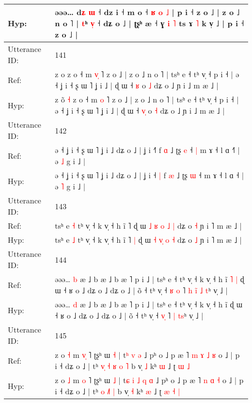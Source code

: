 \documentclass[10pt]{article}
\DeclareRobustCommand{\hl}[1]{{\textcolor{red}{#1}}}
\begin{document}
\begin{longtable}{ll}
 \\
Hyp: & əəə… d\hl{ʑ} \hl{ɯ} ˧ dz i ˧ m o ˧\hl{ }\hl{ʁ}\hl{ }\hl{o}\hl{ }\hl{˩} | p i ˧ z o ˩ | z o ˩ n o ˥ | \hl{}\hl{t}ʰ \hl{v}\hl{̩} ˧ dʑ o ˩ | ʈʂʰ æ ˧ ɣ \hl{i} \hl{˥} ts ɤ \hl{˥} k v̩ ˩ | p i ˧ z o ˩ |
 \\
\midrule
Utterance ID: & 141 \\
Ref: & z o\hl{}\hl{}\hl{} z o ˧ m \hl{v}\hl{̩} ˥ z o ˩ | z o ˩ n o ˥ | tsʰ e ˧ tʰ v̩ ˧ p i ˧ | ə ˧ ʝ i ˧ ʂ ɯ ˥ ʝ i ˩ | ɖ ɯ ˧ \hl{}\hl{ʁ} o \hl{˩} dʑ o ˩ ɲ i ˩ m æ ˩ |
 \\
Hyp: & z o\hl{̃}\hl{ }\hl{˧} z o ˧ m \hl{}\hl{o} ˥ z o ˩ | z o ˩ n o ˥ | tsʰ e ˧ tʰ v̩ ˧ p i ˧ | ə ˧ ʝ i ˧ ʂ ɯ ˥ ʝ i ˩ | ɖ ɯ ˧ \hl{v}\hl{̩} o \hl{˧} dʑ o ˩ ɲ i ˩ m æ ˩ |
 \\
\midrule
Utterance ID: & 142 \\
Ref: & ə ˧ ʝ i ˧ ʂ ɯ ˥ ʝ i ˩ dʑ o ˩ | ʝ i ˧\hl{}\hl{˥} f \hl{ɑ} ˩ ʈʂ \hl{e} ˧\hl{ }\hl{|} m ɤ ˧ l ɑ ˧\hl{˥} | ə \hl{˩} g i ˩ |
 \\
Hyp: & ə ˧ ʝ i ˧ ʂ ɯ ˥ ʝ i ˩ dʑ o ˩ | ʝ i ˧\hl{ }\hl{|} f \hl{æ} ˩ ʈʂ \hl{ɯ} ˧\hl{}\hl{} m ɤ ˧ l ɑ ˧\hl{} | ə \hl{˥} g i ˩ |
 \\
\midrule
Utterance ID: & 143 \\
Ref: & tsʰ e \hl{˧} tʰ v̩ ˧ k v̩ ˧ h ĩ ˥\hl{}\hl{} ɖ ɯ \hl{˩} \hl{ʁ}\hl{ }\hl{o} \hl{˩} \hl{|} dʑ o \hl{˧} ɲ i ˥ m æ ˩ |
 \\
Hyp: & tsʰ e \hl{˩} tʰ v̩ ˧ k v̩ ˧ h ĩ ˥\hl{ }\hl{|} ɖ ɯ \hl{˧} \hl{}\hl{v}\hl{̩} \hl{o} \hl{˧} dʑ o \hl{˩} ɲ i ˥ m æ ˩ |
 \\
\midrule
Utterance ID: & 144 \\
Ref: & əəə… \hl{b} æ ˩ b æ ˩ b æ ˥ p i ˩ | tsʰ e ˧ tʰ v̩ ˧ k v̩ ˧ h ĩ\hl{ }\hl{˥}\hl{ }\hl{|} ɖ ɯ ˧ ʁ o ˩ dʑ o ˩ dʑ o ˩ | õ ˧ tʰ v̩ ˧ \hl{ʁ}\hl{ }\hl{o} ˥\hl{ }\hl{h} \hl{i}\hl{̃} \hl{˩}\hl{ }\hl{t}ʰ v̩ ˩ |
 \\
Hyp: & əəə… \hl{d} æ ˩ b æ ˩ b æ ˥ p i ˩ | tsʰ e ˧ tʰ v̩ ˧ k v̩ ˧ h ĩ\hl{}\hl{}\hl{}\hl{} ɖ ɯ ˧ ʁ o ˩ dʑ o ˩ dʑ o ˩ | õ ˧ tʰ v̩ ˧ \hl{}\hl{v}\hl{̩} ˥\hl{}\hl{} \hl{}\hl{|} \hl{}\hl{t}\hl{s}ʰ v̩ ˩ |
 \\
\midrule
Utterance ID: & 145 \\
Ref: & z o \hl{˧} m \hl{v}\hl{̩} ˥ ʈʂʰ ɯ \hl{˧} | t\hl{}\hl{}\hl{}\hl{}\hl{ʰ} \hl{v} \hl{ə} ˩ pʰ o ˩ p æ ˥\hl{ }\hl{m} \hl{ɤ} \hl{˩} \hl{ʁ} o ˩ | p i ˧ dʑ o ˩ | tʰ\hl{ }\hl{v}\hl{̩} \hl{˧} \hl{ʁ}\hl{ }\hl{o} \hl{˥} b v̩ \hl{˩} kʰ \hl{ɯ} ˩ ʈ\hl{}\hl{} \hl{ɯ} \hl{˩}
 \\
Hyp: & z o \hl{˩} m \hl{}\hl{o} ˥ ʈʂʰ ɯ \hl{˩} | t\hl{ɕ}\hl{ }\hl{i}\hl{ }\hl{˩} \hl{q} \hl{ɑ} ˩ pʰ o ˩ p æ ˥\hl{}\hl{} \hl{n} \hl{ɑ} \hl{˧} o ˩ | p i ˧ dʑ o ˩ | tʰ\hl{}\hl{}\hl{} \hl{o} \hl{}\hl{˩}\hl{˥} \hl{|} b v̩ \hl{˧} kʰ \hl{æ} ˩ ʈ\hl{ }\hl{æ} \hl{˧} \hl{|}

\end{longtable}
\end{document}
